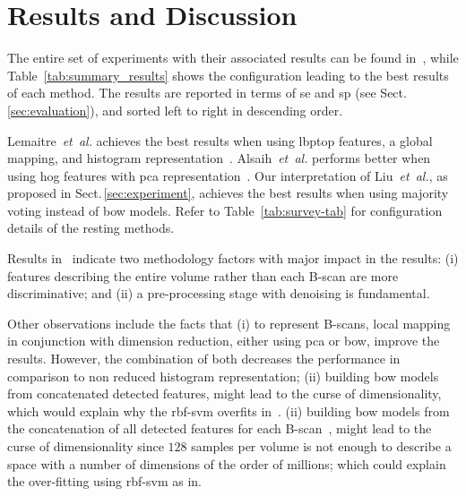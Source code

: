 \section{Results and Discussion}\label{sec:results}\label{sec:discussion}

The entire set of experiments with their associated results can be found in~\cite{rethinopaty20016apr-repoICPR}, while Table~\ref{tab:summary_results} shows the configuration leading to the best results of each method.
The results are reported in terms of \gls{se} and \gls{sp} (see Sect.\,\ref{sec:evaluation}), and sorted left to right in descending order.

Lemaitre~\emph{et~al.} achieves the best results when using \gls{lbptop} features, a global mapping, and histogram representation~\cite{Lemaintre2015miccaiOCT}.
Alsaih~\emph{et~al.} performs better when using \gls{hog} features with \gls{pca} representation~\cite{Alsaih2016apr-repoICPR}.
Our interpretation of Liu~\emph{et~al.}, as proposed in Sect.\,\ref{sec:experiment}, achieves the best results when using majority voting instead of \gls{bow} models.
Refer to Table~\ref{tab:survey-tab} for configuration details of the resting methods.

Results in~\cite{rethinopaty20016apr-repoICPR} indicate two methodology factors with major impact in the results:
(i) features describing the entire volume rather than each B-scan are more discriminative; and
(ii) a pre-processing stage with denoising is fundamental.

Other observations include the facts that
(i) to represent B-scans, local mapping in conjunction with dimension reduction, either using \gls{pca} or \gls{bow}, improve the results.
However, the combination of both decreases the performance in comparison to non reduced histogram representation;
(ii) building \gls{bow} models from concatenated detected features, might lead to the curse of dimensionality, which would explain why the \gls{rbf}-\gls{svm} overfits in~\cite{Alsaih2016apr-repoICPR, liu20016apr-repoICPR}.
(ii) building \gls{bow} models from the concatenation of all detected features for each B-scan~\cite{Alsaih2016apr-repoICPR, liu20016apr-repoICPR}, might lead to the curse of dimensionality since $128$ samples per volume is not enough to describe a space with a number of dimensions of the order of millions; which could explain the over-fitting using \gls{rbf}-\gls{svm} as in.
